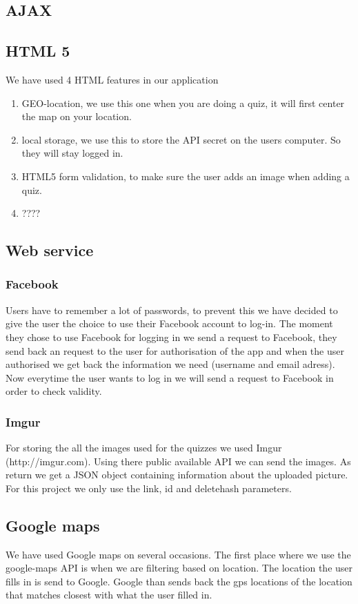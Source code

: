 \documentclass[11pt, oneside]{article}   	%
\begin{document}
\subsection{AJAX}

\subsection{HTML 5}
We have used 4 HTML features in our application

\begin{enumerate}
\item GEO-location, we use this one when you are doing a quiz, it will first center the map on your location.
\item local storage, we use this to store the API secret on the users computer. So they will stay logged in.
\item HTML5 form validation, to make sure the user adds an image when adding a quiz.
\item ????
\end{enumerate}


\subsection{Web service}
\subsubsection{Facebook}
Users have to remember a lot of passwords, to prevent this we have decided to give the user the choice to use their Facebook account to log-in. The moment they chose to use Facebook for logging in we send a request to Facebook, they send back an request to the user for authorisation of the app and when the user authorised we get back the information we need (username and email adress). Now everytime the user wants to log in we will send a request to Facebook in order to check validity.

\subsubsection{Imgur}
For storing the all the images used for the quizzes we used Imgur (http://imgur.com). Using there public available API we can send the images. As return we get a JSON object containing information about the uploaded picture. For this project we only use the link, id and deletehash parameters.

\subsection{Google maps}
We have used Google maps on several occasions.
The first place where we use the google-maps API is when we are filtering based on location. The location the user fills in is send to Google. Google than sends back the gps locations of the location that matches closest with what the user filled in. \\
\end{document}
